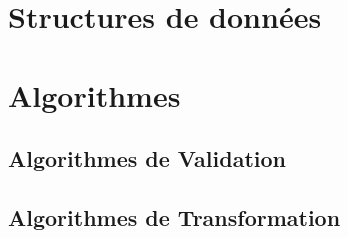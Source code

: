 
\section{Structures de données}

\section{Algorithmes}

\subsection{Algorithmes de Validation}

\subsection{Algorithmes de Transformation}


